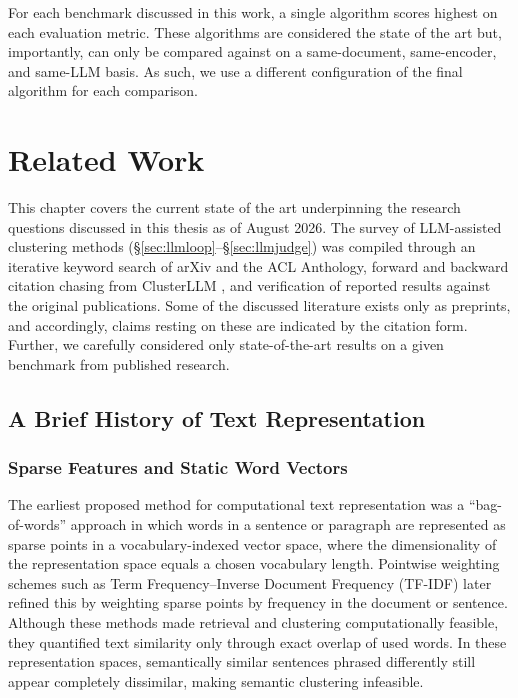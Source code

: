 \documentclass[11pt,a4paper,oneside]{report}
\begin{document}
\vspace{\baselineskip}

For each benchmark discussed in this work, a single algorithm scores highest on each evaluation metric. These algorithms are considered the state of the art but, importantly, can only be compared against on a same-document, same-encoder, and same-LLM basis. As such, we use a different configuration of the final algorithm for each comparison.

\chapter{Related Work}\label{ch:litreview}

This chapter covers the current state of the art underpinning the research questions discussed in this thesis as of August 2026. The survey of LLM-assisted clustering methods (\S\ref{sec:llmloop}--\S\ref{sec:llmjudge}) was compiled through an iterative keyword search of arXiv and the ACL Anthology, forward and backward citation chasing from ClusterLLM \citep{zhang2023clusterllm}, and verification of reported results against the original publications. Some of the discussed literature exists only as preprints, and accordingly, claims resting on these are indicated by the citation form. Further, we carefully considered only state-of-the-art results on a given benchmark from published research.

\section{A Brief History of Text Representation}\label{sec:representation}

\subsection{Sparse Features and Static Word Vectors}

The earliest proposed method for computational text representation \citep{salton1975vector} was a ``bag-of-words'' approach in which words in a sentence or paragraph are represented as sparse points in a vocabulary-indexed vector space, where the dimensionality of the representation space equals a chosen vocabulary length. Pointwise weighting schemes such as Term Frequency--Inverse Document Frequency (TF-IDF) \citep{salton1988term} later refined this by weighting sparse points by frequency in the document or sentence. Although these methods made retrieval and clustering computationally feasible, they quantified text similarity only through exact overlap of used words. In these representation spaces, semantically similar sentences phrased differently still appear completely dissimilar, making semantic clustering infeasible.
\end{document}

